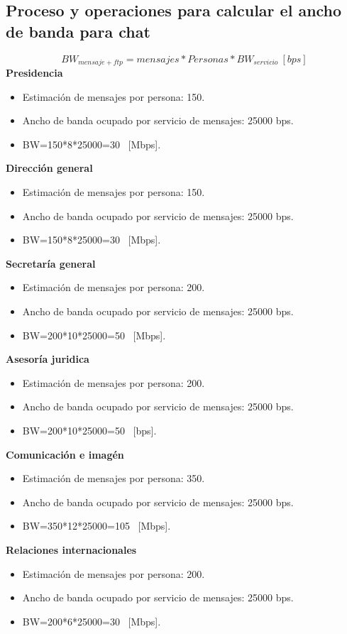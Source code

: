 \documentclass[12pt,letterpaper]{article}
\begin{document}
\subsection{Proceso y operaciones para calcular el ancho de banda para chat}
\begin{equation}
    BW_{mensaje+ftp}=mensajes*Personas*BW_{servicio} \ [bps]
\end{equation}
\textbf{Presidencia}
\begin{itemize}
    \item Estimación de mensajes por persona: 150. 
    \item Ancho de banda ocupado por servicio de mensajes: 25000 bps.
    \item BW=150*8*25000=30 \ [Mbps].
\end{itemize}
\textbf{Dirección general}
\begin{itemize}
    \item Estimación de mensajes por persona: 150. 
    \item Ancho de banda ocupado por servicio de mensajes: 25000 bps.
    \item BW=150*8*25000=30 \ [Mbps].
\end{itemize}
\textbf{Secretaría general}
\begin{itemize}
    \item Estimación de mensajes por persona: 200. 
    \item Ancho de banda ocupado por servicio de mensajes: 25000 bps.
    \item BW=200*10*25000=50 \ [Mbps].
\end{itemize}
\textbf{Asesoría juridica}
\begin{itemize}
    \item Estimación de mensajes por persona: 200. 
    \item Ancho de banda ocupado por servicio de mensajes: 25000 bps.
    \item BW=200*10*25000=50 \ [bps].
\end{itemize}
\textbf{Comunicación e imagén}
\begin{itemize}
    \item Estimación de mensajes por persona: 350. 
    \item Ancho de banda ocupado por servicio de mensajes: 25000 bps.
    \item BW=350*12*25000=105 \ [Mbps].
\end{itemize}
\textbf{Relaciones internacionales}
\begin{itemize}
    \item Estimación de mensajes por persona: 200. 
    \item Ancho de banda ocupado por servicio de mensajes: 25000 bps.
    \item BW=200*6*25000=30 \ [Mbps].
\end{itemize}
\end{document}
